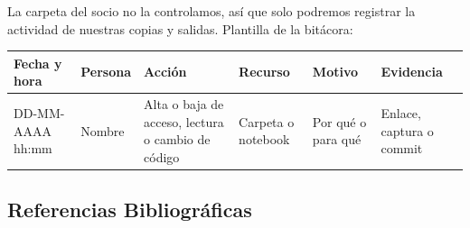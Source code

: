 La carpeta del socio no la controlamos, así que solo podremos registrar la actividad de nuestras copias y salidas. Plantilla de la bitácora:

\begin{table}[H]
  \centering
  \small
  \begin{tabularx}{\textwidth}{XXXXXX}
    \toprule
    Fecha y hora & Persona & Acción & Recurso & Motivo & Evidencia \\
    \midrule
    DD-MM-AAAA hh:mm & Nombre & Alta o baja de acceso, lectura o cambio de código & Carpeta o notebook & Por qué o para qué & Enlace, captura o commit \\
    \bottomrule
  \end{tabularx}
\end{table}

\subsection*{Referencias Bibliográficas}

